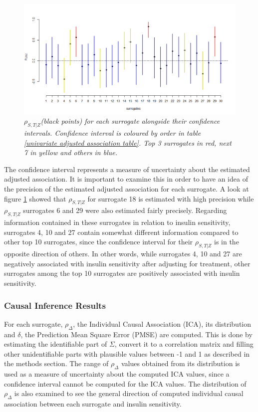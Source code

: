 \documentclass[a4paper,12pt]{article}
\begin{document}
	\begin{figure}[H]
		\centering
		\includegraphics[scale=0.5]{adjustedassociationplot.png}
		\caption{\emph{$\rho_{S,T|Z}$(black points) for each surrogate alongside their confidence intervals. Confidence interval is coloured by order in table \ref{univariate adjusted association table}. Top 3 surrogates in red, next 7 in yellow and others in blue.}}\label{adjusted association plot}
	\end{figure}
	
	The confidence interval represents a measure of uncertainty about the estimated adjusted association. It is important to examine this in order to have an idea of the precision of the estimated adjusted association for each surrogate. A look at figure \ref{adjusted association plot} showed that $\rho_{S,T|Z}$ for surrogate 18 is estimated with high precision while $\rho_{S,T|Z}$ surrogates 6 and 29 were also estimated fairly precisely. Regarding information contained in these surrogates in relation to insulin sensitivity, surrogates 4, 10 and 27 contain somewhat different information compared to other top 10 surrogates, since the confidence interval for their $\rho_{S,T|Z}$ is in the opposite direction of others. In other words, while surrogates 4, 10 and 27 are negatively associated with insulin sensitivity after adjusting for treatment, other surrogates among the top 10 surrogates are positively associated with insulin sensitivity.
	
	\subsubsection{Causal Inference Results}
	For each surrogate, $\rho_{\Delta}$, the Individual Causal Association (ICA),  its distribution and $\delta$, the Prediction Mean Square Error (PMSE) are computed. This is done by estimating the identifiable part of $\Sigma$, convert it to a correlation matrix and filling other unidentifiable parts with plausible values between -1 and 1 as described in the methods section.  The range of $\rho_{\Delta}$ values obtained from its distribution is used as a measure of uncertainty about the computed ICA values, since a confidence interval cannot be computed for the ICA values. The distribution of $\rho_{\Delta}$ is also examined to see the general direction of computed individual causal association between each surrogate and insulin sensitivity.
	
\end{document}
